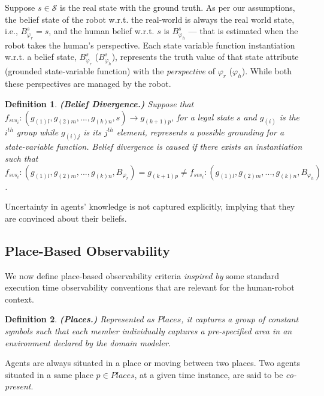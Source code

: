 \documentclass[letterpaper]{article} %
\newtheorem{definition}{Definition}
\begin{document}
Suppose $s \in \mathcal{S}$ is the real state with the ground truth. As per our assumptions, the belief state of the robot w.r.t. the real-world is always the real world state, i.e., $B_{\varphi_r}^s = s$, and the human belief w.r.t. $s$ is $B_{\varphi_h}^s$ --- that is estimated when the robot takes the human's perspective. Each state variable function instantiation w.r.t. a belief state, $B_{\varphi_r}^s$ ($B_{\varphi_h}^s$), represents the truth value of that state attribute 
(grounded state-variable function)
with the \textit{perspective} of 
$\varphi_r$ ($\varphi_h$). While both these perspectives are managed by the robot.

\begin{definition}
\textbf{(Belief Divergence.)}
Suppose that $f_{\textit{svs}_i}:(g_{(1)l},g_{(2)m},...,g_{(k)n},s) \rightarrow g_{(k+1)p}$, for a legal state $s$ and $g_{(i)}$ is the $i^{th}$ group while $g_{(i)j}$ is its $j^{th}$ element, represents a possible {\em grounding} for a state-variable function.
Belief divergence is caused if there exists an instantiation such that $f_{\textit{svs}_i}:(g_{(1)l},g_{(2)m},...,g_{(k)n},B_{\varphi_r}) = {g_{(k+1)p}}  \neq f_{\textit{svs}_i}:(g_{(1)l},g_{(2)m},...,g_{(k)n},B_{\varphi_h})$.
\end{definition} 

Uncertainty in agents' knowledge is not captured explicitly, implying that they are convinced about their beliefs.

\subsection{Place-Based Observability}
We now define place-based observability criteria \textit{inspired by} some standard execution time observability conventions that are relevant for the human-robot context. 

\begin{definition}
\textbf{(Places.)} Represented as $\mathit{Places}$, 
it
captures a group of constant symbols such that each member individually captures a pre-specified area in an environment declared by the domain modeler.  
\end{definition}
Agents are always situated in a place or moving between two places. Two agents situated in a same place $p \in \mathit{Places}$, at a given time instance, are said to be \textit{co-present}.
\end{document}
